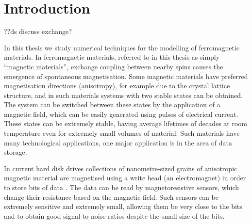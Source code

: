 
\chapter{Introduction}
\label{sec:introduction}

??ds discuss exchange?

In this thesis we study numerical techniques for the modelling of ferromagnetic materials.
In ferromagnetic materials, referred to in this thesis as simply ``magnetic materials'', exchange coupling between nearby spins causes the emergence of spontaneous magnetisation.
Some magnetic materials have preferred magnetisation directions (anisotropy), for example due to the crystal lattice structure, and in such materials systems with two stable states can be obtained.
The system can be switched between these states by the application of a magnetic field, which can be easily generated using pulses of electrical current.
These states can be extremely stable, having average lifetimes of decades at room temperature even for extremely small volumes of material.
Such materials have many technological applications, one major application is in the area of data storage.

In current hard disk drives collections of nanometre-sized grains of anisotropic magnetic material are magnetised using a write head (an electromagnet) in order to store bits of data \cite[Sec. 14.6]{Kronmuller1997}.
The data can be read by magnetoresistive sensors, which change their resistance based on the magnetic field.
Such sensors can be extremely sensitive and extremely small, allowing them be very close to the bits and to obtain good signal-to-noise ratios despite the small size of the bits.

